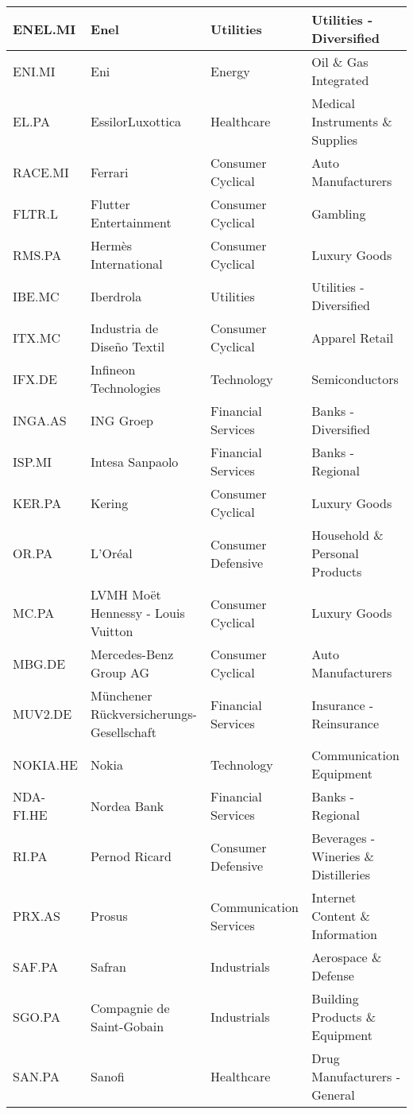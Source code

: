 \begin{longtable}{|p{2cm}|p{3cm}|p{4cm}|p{4cm}|}
ENEL.MI & Enel & Utilities & Utilities - Diversified \\ \hline
ENI.MI & Eni & Energy & Oil \& Gas Integrated \\ \hline
EL.PA & EssilorLuxottica & Healthcare & Medical Instruments \& Supplies \\ \hline
RACE.MI & Ferrari & Consumer Cyclical & Auto Manufacturers \\ \hline
FLTR.L & Flutter Entertainment & Consumer Cyclical & Gambling \\ \hline
RMS.PA & Hermès International & Consumer Cyclical & Luxury Goods \\ \hline
IBE.MC & Iberdrola & Utilities & Utilities - Diversified \\ \hline
ITX.MC & Industria de Diseño Textil & Consumer Cyclical & Apparel Retail \\ \hline
IFX.DE & Infineon Technologies & Technology & Semiconductors \\ \hline
INGA.AS & ING Groep & Financial Services & Banks - Diversified \\ \hline
ISP.MI & Intesa Sanpaolo & Financial Services & Banks - Regional \\ \hline
KER.PA & Kering & Consumer Cyclical & Luxury Goods \\ \hline
OR.PA & L'Oréal & Consumer Defensive & Household \& Personal Products \\ \hline
MC.PA & LVMH Moët Hennessy - Louis Vuitton & Consumer Cyclical & Luxury Goods \\ \hline
MBG.DE & Mercedes-Benz Group AG & Consumer Cyclical & Auto Manufacturers \\ \hline
MUV2.DE & Münchener Rückversicherungs-Gesellschaft & Financial Services & Insurance - Reinsurance \\ \hline
NOKIA.HE & Nokia & Technology & Communication Equipment \\ \hline
NDA-FI.HE & Nordea Bank & Financial Services & Banks - Regional \\ \hline
RI.PA & Pernod Ricard & Consumer Defensive & Beverages - Wineries \& Distilleries \\ \hline
PRX.AS & Prosus & Communication Services & Internet Content \& Information \\ \hline
SAF.PA & Safran & Industrials & Aerospace \& Defense \\ \hline
SGO.PA & Compagnie de Saint-Gobain & Industrials & Building Products \& Equipment \\ \hline
SAN.PA & Sanofi & Healthcare & Drug Manufacturers - General \\ \hline

\end{longtable}
